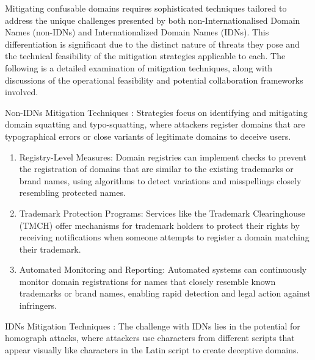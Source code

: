Mitigating confusable domains requires sophisticated techniques tailored to address the unique challenges presented by both non-Internationalised Domain Names (non-IDNs) and Internationalized Domain Names (IDNs). This differentiation is significant  due to the distinct nature of threats they pose and the technical feasibility of the mitigation strategies applicable to each. The following is a detailed examination of mitigation techniques, along with discussions of the operational feasibility and potential collaboration frameworks involved.

Non-IDNs Mitigation Techniques : Strategies focus on identifying and mitigating domain squatting and typo-squatting, where attackers register domains that are typographical errors or close variants of legitimate domains to deceive users.

\begin{enumerate}
  \item Registry-Level Measures: Domain registries can implement checks to prevent the registration of domains that are similar to the existing trademarks or brand names, using algorithms to detect variations and misspellings closely resembling protected names. \cite{WTR2020} 
  \item Trademark Protection Programs: Services like the Trademark Clearinghouse (TMCH) offer mechanisms for trademark holders to protect their rights by receiving notifications when someone attempts to register a domain matching their trademark. \cite{ICANNTMCH}
  \item Automated Monitoring and Reporting: Automated systems can continuously monitor domain registrations for names that closely resemble known trademarks or brand names, enabling rapid detection and legal action against infringers. \cite{TMCH2023}
\end{enumerate}

IDNs Mitigation Techniques : The challenge with IDNs lies in the potential for homograph attacks, where attackers use characters from different scripts that appear visually like characters in the Latin script to create deceptive domains.

